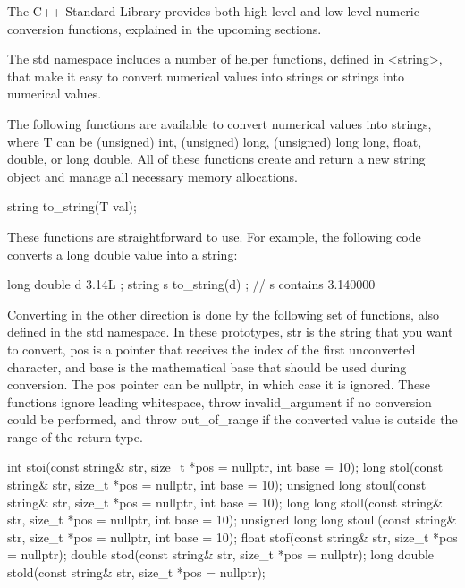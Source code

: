 
The C++ Standard Library provides both high-level and low-level numeric conversion functions, explained in the upcoming sections.


The std namespace includes a number of helper functions, defined in <string>, that make it easy to convert numerical values into strings or strings into numerical values.


The following functions are available to convert numerical values into strings, where T can be (unsigned) int, (unsigned) long, (unsigned) long long, float, double, or long double. All of these functions create and return a new string object and manage all necessary memory allocations.

\begin{cpp}
string to_string(T val);
\end{cpp}

These functions are straightforward to use. For example, the following code converts a long double value into a string:

\begin{cpp}
long double d { 3.14L };
string s { to_string(d) }; // s contains 3.140000
\end{cpp}


Converting in the other direction is done by the following set of functions, also defined in the std namespace. In these prototypes, str is the string that you want to convert, pos is a pointer that receives the index of the first unconverted character, and base is the mathematical base that should be used during conversion. The pos pointer can be nullptr, in which case it is ignored. These functions ignore leading whitespace, throw invalid\_argument if no conversion could be performed, and throw out\_of\_range if the converted value is outside the range of the return type.

\begin{cpp}
int stoi(const string& str, size_t *pos = nullptr, int base = 10);
long stol(const string& str, size_t *pos = nullptr, int base = 10);
unsigned long stoul(const string& str, size_t *pos = nullptr, int base = 10);
long long stoll(const string& str, size_t *pos = nullptr, int base = 10);
unsigned long long stoull(const string& str, size_t *pos = nullptr, int base = 10);
float stof(const string& str, size_t *pos = nullptr);
double stod(const string& str, size_t *pos = nullptr);
long double stold(const string& str, size_t *pos = nullptr);
\end{cpp}

